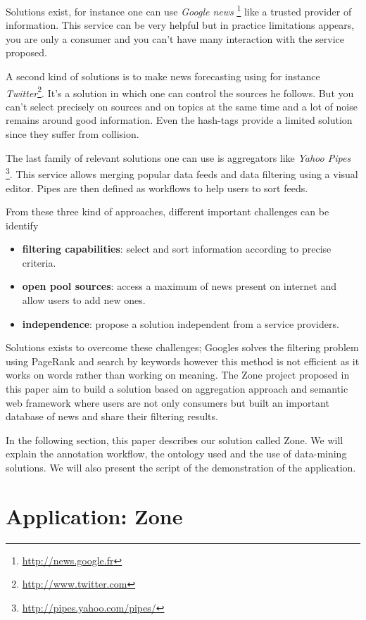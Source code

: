 \documentclass{llncs}
\begin{document}
Solutions exist, for instance one can use \textsl{Google news} \footnote{\url{http://news.google.fr}} like a trusted provider of information. This service can be very helpful but in practice limitations appears, you are only a consumer and you can't have many interaction with the service proposed.

A second kind of solutions is to make news forecasting using for instance \textsl{Twitter}\footnote{\url{http://www.twitter.com}}. It's a solution in which one can control the sources he follows. But you can't select precisely on sources and on topics at the same time and a lot of noise remains around good information. Even the hash-tags provide a limited solution since they suffer from collision.  

The last family of relevant solutions one can use is aggregators like \textsl{Yahoo Pipes} \footnote{\url{http://pipes.yahoo.com/pipes/}}. This service allows merging popular data feeds and data filtering using a visual editor. Pipes are then defined as workflows to help users to sort feeds.

From these three kind of approaches, different important challenges can be identify
\begin{itemize}
  \item \textbf{filtering capabilities}: select and sort information according to precise criteria.
  \item \textbf{open pool sources}: access a maximum of news present on internet and allow users to add new ones.
  \item \textbf{independence}: propose a solution independent from a service providers.
\end{itemize}

Solutions exists to overcome these challenges; Googles solves the filtering problem using PageRank and search by keywords \cite{page:brin} however this method is not efficient as it works on words rather than working on meaning. The Zone project proposed in this paper aim to build a solution based on aggregation approach and semantic web framework where users are not only consumers but built an important database of news and share their filtering results.

In the following section, this paper describes our solution called Zone. We will explain the annotation workflow, the ontology used and the use of data-mining solutions. We will also present the script of the demonstration of the application.

%
\section{Application: Zone}
\end{document}
